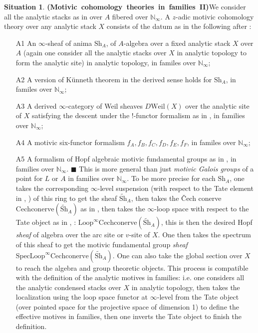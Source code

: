 \documentclass[12pt]{article}
\theoremstyle{definition}
\newtheorem{situation}{Situation}
\begin{document}
\begin{situation}\mbox{\textbf{(Motivic cohomology theories in families II)}}\label{situation2}
We consider all the analytic stacks as in \cite{3CS1} over $A$ fibered over $\mathbb{N}_\infty$. A $z$-adic motivic cohomology theory over any analytic stack $X$ consists of the datum as in the following after \cite{3A}:
\begin{itemize}
\item[A1] An $\infty$-sheaf of anima $\mathrm{Sh}_A$, of $A$-algebra over a fixed analytic stack $X$ over $A$ (again one consider all the analytic stacks over $X$ in analytic topology to form the analytic site) in analytic topology, in familes over $\mathbb{N}_\infty$;
\item[A2] A version of K\"unneth theorem in the derived sense holds for $\mathrm{Sh}_A$, in familes over $\mathbb{N}_\infty$;
\item[A3] A derived $\infty$-category of Weil sheaves $D\mathrm{Weil}(X)$ over the analytic site of $X$ satisfying the descent under the !-functor formalism as in \cite{3CS1}, in families over $\mathbb{N}_\infty$; 
\item[A4] A motivic six-functor formalism $f_A,f_B,f_C,f_D,f_E,f_F$, in familes over $\mathbb{N}_\infty$;
\item[A5] A formalism of Hopf algebraic motivic fundamental groups as in \cite[4.7]{3A}, in families over $\mathbb{N}_\infty$.
\subitem $\blacksquare$ This is more general than just \textit{motivic Galois groups} of a point for $L$ or $A$ in families over $\mathbb{N}_\infty$. To be more precise for each $\mathrm{Sh}_A$, one takes the corresponding $\infty$-level suspension (with respect to the Tate element in \cite{3A}, \cite{3S}) of this ring to get the sheaf $\widetilde{\mathrm{Sh}}_A$, then takes the \v{C}ech conerve $\mathrm{Cechconerve}(\widetilde{\mathrm{Sh}}_A)$ as in \cite[4.9]{3A}, then takes the $\infty$-loop space with respect to the Tate object as in \cite{3A}, \cite{3S}: $\mathrm{Loop}^\infty\mathrm{Cechconerve}(\widetilde{\mathrm{Sh}}_A)$, this is then the desired Hopf \textit{sheaf} of algebra over the arc site or $v$-site of $X$. One then takes the spectrum of this sheaf to get the motivic fundamental group \textit{sheaf} $\mathrm{Spec}\mathrm{Loop}^\infty\mathrm{Cechconerve}(\widetilde{\mathrm{Sh}}_A)$. One can also take the global section over $X$ to reach the algebra and group theoretic objects. This process is compatible with the definition of the analytic  motives in families: i.e. one considers all the analytic condensed stacks over $X$ in analytic topology, then takes the localization using the loop space functor at $\infty$-level from the Tate object (over pointed space for the projective space of dimension 1) to define the effective motives in families, then one inverts the Tate object to finish the definition.

\end{itemize}
\end{situation}
\end{document}
